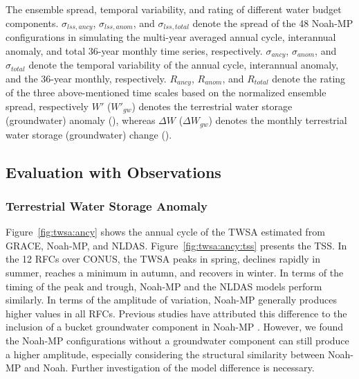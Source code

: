 \documentclass[essd, manuscript]{copernicus}
\let\unit\undefined
\begin{document}
\begin{table}[t]
  \caption{The ensemble spread, temporal variability, and rating of different water budget components. \(\sigma_{lss,ancy}\), \(\sigma_{lss,anom}\), and \(\sigma_{lss,total}\) denote the spread of the 48 Noah-MP configurations in simulating the multi-year averaged annual cycle, interannual anomaly, and total 36-year monthly time series, respectively. \(\sigma_{ancy}\), \(\sigma_{anom}\), and \(\sigma_{total}\) denote the temporal variability of the annual cycle, interannual anomaly, and the 36-year monthly, respectively. \(R_{ancy}\), \(R_{anom}\), and \(R_{total}\) denote the rating of the three above-mentioned time scales based on the normalized ensemble spread, respectively \(W'\) (\(W'_{gw}\)) denotes the terrestrial water storage (groundwater) anomaly (\unit{kg.m^{-2}}), whereas \(\Delta W\) (\(\Delta W_{gw}\)) denotes the monthly terrestrial water storage (groundwater) change (\unit{kg.m^{-2}.s^{-1}}).}
  \label{tab:statistics}
  \tiny
  
\end{table}

\subsection{Evaluation with Observations}\label{sec:results:evaluation}

\subsubsection{Terrestrial Water Storage Anomaly}\label{sec:results:twsa}

Figure~\ref{fig:twsa:ancy} shows the annual cycle of the TWSA estimated from GRACE, Noah-MP, and NLDAS. Figure~\ref{fig:twsa:ancy:tss} presents the TSS\@. In the 12 RFCs over CONUS, the TWSA peaks in spring, declines rapidly in summer, reaches a minimum in autumn, and recovers in winter. In terms of the timing of the peak and trough, Noah-MP and the NLDAS models perform similarly. In terms of the amplitude of variation, Noah-MP generally produces higher values in all RFCs. Previous studies have attributed this difference to the inclusion of a bucket groundwater component in Noah-MP \citep{cai2014JGRAa, ma2017JGRA}. However, we found the Noah-MP configurations without a groundwater component can still produce a higher amplitude, especially considering the structural similarity between Noah-MP and Noah. Further investigation of the model difference is necessary.
\end{document}

